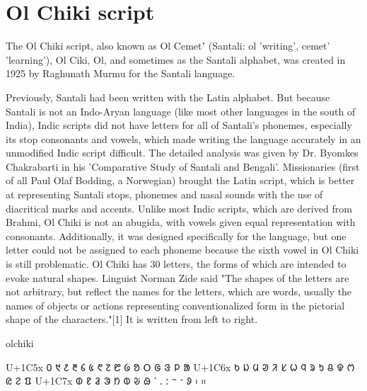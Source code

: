 















\section{Ol Chiki script}
\label{s:olchiki}
\arial

The Ol Chiki script, also known as Ol Cemetʼ (Santali: ol 'writing', cemet' 'learning'), Ol Ciki, Ol, and sometimes as the Santali alphabet, was created in 1925 by Raghunath Murmu for the Santali language.

Previously, Santali had been written with the Latin alphabet. But because Santali is not an Indo-Aryan language (like most other languages in the south of India), Indic scripts did not have letters for all of Santali's phonemes, especially its stop consonants and vowels, which made writing the language accurately in an unmodified Indic script difficult. The detailed analysis was given by Dr. Byomkes Chakrabarti in his 'Comparative Study of Santali and Bengali'. Missionaries (first of all Paul Olaf Bodding, a Norwegian) brought the Latin script, which is better at representing Santali stops, phonemes and nasal sounds with the use of diacritical marks and accents. Unlike most Indic scripts, which are derived from Brahmi, Ol Chiki is not an abugida, with vowels given equal representation with consonants. Additionally, it was designed specifically for the language, but one letter could not be assigned to each phoneme because the sixth vowel in Ol Chiki is still problematic.
Ol Chiki has 30 letters, the forms of which are intended to evoke natural shapes. Linguist Norman Zide said "The shapes of the letters are not arbitrary, but reflect the names for the letters, which are words, usually the names of objects or actions representing conventionalized form in the pictorial shape of the characters."[1] It is written from left to right.

\newfontfamily{}

\begin{scriptexample}[]{olchiki}
\bgroup
\olchiki
\obeylines

U+1C5x 	᱐	᱑	᱒	᱓	᱔	᱕	᱖	᱗	᱘	᱙	ᱚ	ᱛ	ᱜ	ᱝ	ᱞ	ᱟ
U+1C6x	   ᱠ	ᱡ	ᱢ	ᱣ	ᱤ	ᱥ	ᱦ	ᱧ	ᱨ	ᱩ	ᱪ	ᱫ	ᱬ	ᱭ	ᱮ	ᱯ
U+1C7x  	ᱰ	ᱱ	ᱲ	ᱳ	ᱴ	ᱵ	ᱶ	ᱷ	ᱸ	ᱹ	ᱺ	ᱻ	ᱼ	ᱽ	᱾	᱿
\egroup

\end{scriptexample}

